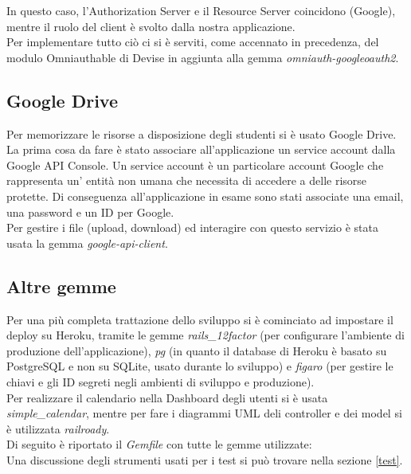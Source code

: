 \documentclass[Lau, binding=0.6cm, oneside]{sapthesis}
\begin{document}
In questo caso, l’Authorization Server e il Resource Server coincidono (Google), mentre il ruolo del client è svolto dalla nostra applicazione.\\
Per implementare tutto ciò ci si è serviti, come accennato in precedenza, del modulo Omniauthable di Devise in aggiunta alla gemma \textit{omniauth-googleoauth2}.

\subsection{Google Drive}

Per memorizzare le risorse a disposizione degli studenti si è usato Google Drive.\\
La prima cosa da fare è stato associare all'applicazione un service account dalla Google API Console. Un service account è un particolare account Google che rappresenta un' entità non umana che necessita di accedere a delle risorse protette. Di conseguenza all'applicazione in esame sono stati associate una email, una password e un ID per Google.\\
Per gestire i file (upload, download) ed interagire con questo servizio è stata usata la gemma \textit{google-api-client}.

\subsection{Altre gemme}

Per una più completa trattazione dello sviluppo si è cominciato ad impostare il deploy su Heroku, tramite le gemme \textit{rails\_12factor} (per configurare l'ambiente di produzione dell'applicazione), \textit{pg} (in quanto il database di Heroku è basato su PostgreSQL e non su SQLite, usato durante lo sviluppo) e \textit{figaro} (per gestire le chiavi e gli ID segreti negli ambienti di sviluppo e produzione).\\
Per realizzare il calendario nella Dashboard degli utenti si è usata \textit{simple\_calendar}, mentre per fare i diagrammi UML deli controller e dei model si è utilizzata \textit{railroady}.\\
Di seguito è riportato il \textit{Gemfile} con tutte le gemme utilizzate:\\



Una discussione degli strumenti usati per i test si può trovare nella sezione \ref{test}.\\
\end{document}
